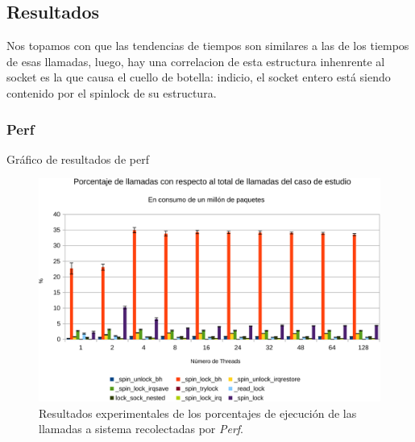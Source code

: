 \subsection{Resultados}
Nos topamos con que las tendencias de tiempos son similares a las de los tiempos de esas llamadas, luego, hay una correlacion de esta estructura inhenrente al socket es la que causa el cuello de botella: indicio, el socket entero está siendo contenido por el spinlock de su estructura.

\subsubsection{Perf}
Gráfico de resultados de perf

\begin{figure}[!h]
	\centering
	\includegraphics[scale=.5]{resultados/perfdetalle-crop.pdf}
	\caption{Resultados experimentales de los porcentajes de ejecución de las llamadas a sistema recolectadas por \emph{Perf}.}
	\label{fig:resPerf}
\end{figure}

